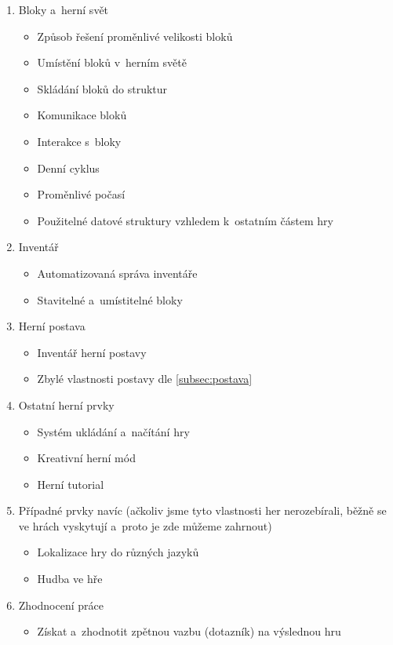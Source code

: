\begin{enumerate}

 \item Bloky a~herní svět
\begin{itemize}
	\item Způsob řešení proměnlivé velikosti bloků
	\item Umístění bloků v~herním světě
	\item Skládání bloků do struktur
	\item Komunikace bloků
	\item Interakce s~bloky
	\item Denní cyklus
	\item Proměnlivé počasí
	\item Použitelné datové struktury vzhledem k~ostatním částem hry
\end{itemize}

 \item Inventář
\begin{itemize}
	\item Automatizovaná správa inventáře
	\item Stavitelné a~umístitelné bloky
\end{itemize}

 \item Herní postava
\begin{itemize}
	\item Inventář herní postavy
	\item Zbylé vlastnosti postavy dle \ref{subsec:postava}
\end{itemize}

 \item Ostatní herní prvky
\begin{itemize}
	\item Systém ukládání a~načítání hry
	\item Kreativní herní mód
	\item Herní tutorial
\end{itemize}

 \item Případné prvky navíc (ačkoliv jsme tyto vlastnosti her nerozebírali, běžně se ve hrách vyskytují a~proto je zde můžeme zahrnout)
\begin{itemize}
	\item Lokalizace hry do různých jazyků
	\item Hudba ve hře
\end{itemize}

 \item Zhodnocení práce
\begin{itemize}
	\item Získat a~zhodnotit zpětnou vazbu (dotazník) na výslednou hru
\end{itemize}


\end{enumerate}
